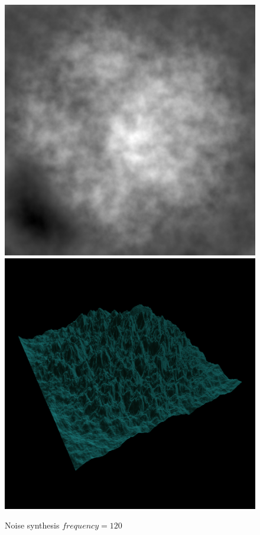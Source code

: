 \begin{figure}[H]
	  \includegraphics[width=\imagewidth]{images/results/terrains/512-1/simplex/120}
	  \includegraphics[width=\imagewidth]{images/results/terrains/512-1/simplex/120_3d}
	  \caption{Noise synthesis $frequency = 120$}
	  \label{fig:ex-noise120-surface}
	\end{figure}
	
